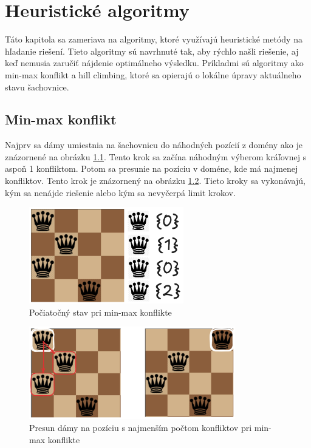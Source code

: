 

\chapter{Heuristické algoritmy}

Táto kapitola sa zameriava na algoritmy, ktoré využívajú heuristické metódy na hľadanie riešení. Tieto algoritmy sú navrhnuté tak, aby rýchlo našli riešenie, aj keď nemusia zaručiť nájdenie optimálneho výsledku. Príkladmi sú algoritmy ako min-max konflikt a hill climbing, ktoré sa opierajú o lokálne úpravy aktuálneho stavu šachovnice.

\section*{Min-max konflikt}
Najprv sa dámy umiestnia na šachovnicu do náhodných pozícií z domény ako je znázornené na obrázku \ref{fig:min-max-zero-step}. Tento krok sa začína náhodným výberom kráľovnej s aspoň 1 konfliktom. Potom sa presunie na pozíciu v doméne, kde má najmenej konfliktov. Tento krok je znázornený na obrázku \ref{fig:min-max-step}. Tieto kroky sa vykonávajú, kým sa nenájde riešenie alebo kým sa nevyčerpá limit krokov.
\begin{figure}
    \centering
    \includegraphics[width=0.6\textwidth]{figs/min-max/min-max-zero-step}
    \caption{Počiatočný stav pri min-max konflikte}
    \label{fig:min-max-zero-step}
\end{figure}
\begin{figure}
    \centering
    \includegraphics[width=0.8\textwidth]{figs/min-max/min-max-step}
    \caption{Presun dámy na pozíciu s najmenším počtom konfliktov pri min-max konflikte}
    \label{fig:min-max-step}
\end{figure}

